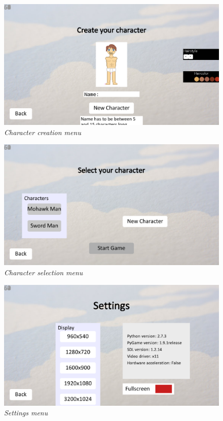 \documentclass[a4paper,12pt]{article}
\begin{document}
\vspace{10pt}
\noindent
\begin{figure}[H]
\includegraphics[width=\textwidth]{img/menushot2.eps}\\
\emph{%
    Character creation menu
}
\end{figure}

\vspace{10pt}
\noindent
\begin{figure}[H]
\includegraphics[width=\textwidth]{img/menushot3.eps}\\
\emph{%
    Character selection menu
}
\end{figure}

\vspace{10pt}
\noindent
\begin{figure}[h]
\includegraphics[width=\textwidth]{img/menushot4.eps}\\
\emph{%
    Settings menu
}
\end{figure}
\end{document}
